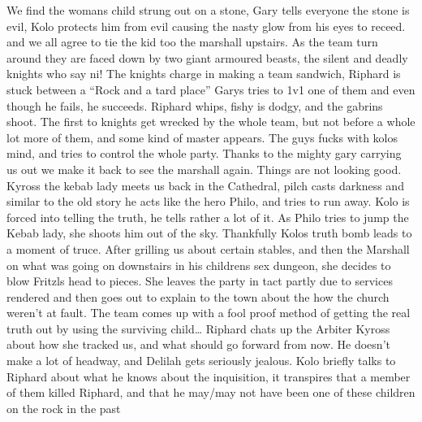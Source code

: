 We find the womans child strung out on a stone, Gary tells everyone the stone is evil, Kolo protects him from evil causing the nasty glow from his eyes to receed. and we all agree to tie the kid too the marshall upstairs.\medskip
As the team turn around they are faced down by two giant armoured beasts, the silent and deadly knights who say ni! The knights charge in making a team sandwich, Riphard is stuck between a “Rock and a tard place”\medskip
Garys tries to 1v1 one of them and even though he fails, he succeeds. Riphard whips, fishy is dodgy, and the gabrins shoot. The first to knights get wrecked by the whole team, but not before a whole lot more of them, and some kind of master appears.\medskip
The guys fucks with kolos mind, and tries to control the whole party. Thanks to the mighty gary carrying us out we make it back to see the marshall again. Things are not looking good.\medskip
Kyross the kebab lady meets us back in the Cathedral, pilch casts darkness and similar to the old story he acts like the hero Philo, and tries to run away. Kolo is forced into telling the truth, he tells rather a lot of it. As Philo tries to jump the Kebab lady, she shoots him out of the sky. Thankfully Kolos truth bomb leads to a moment of truce.\medskip
After grilling us about certain stables, and then the Marshall on what was going on downstairs in his childrens sex dungeon, she decides to blow Fritzls head to pieces. She leaves the party in tact partly due to services rendered and then goes out to explain to the town about the how the church weren’t at fault.\medskip
The team comes up with a fool proof method of getting the real truth out by using the surviving child…\medskip
Riphard chats up the Arbiter Kyross about how she tracked us, and what should go forward from now. He doesn’t make a lot of headway, and Delilah gets seriously jealous.\medskip
Kolo briefly talks to Riphard about what he knows about the inquisition, it transpires that a member of them killed Riphard, and that he may/may not have been one of these children on the rock in the past